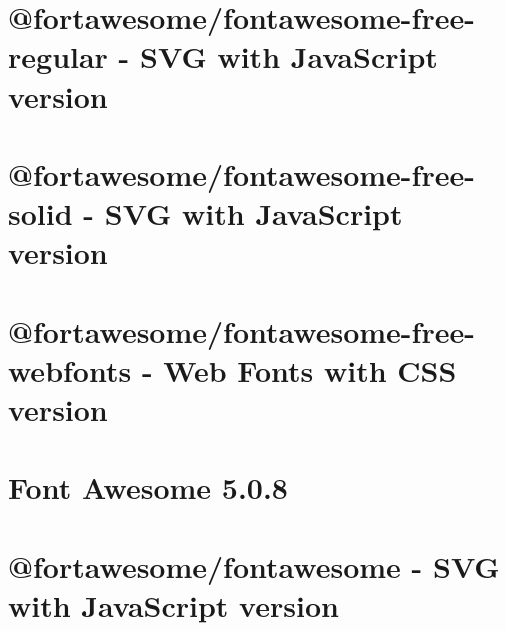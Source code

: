 \let\mypdfximage\pdfximage\def\pdfximage{\immediate\mypdfximage}\documentclass[twoside]{book}
\newcommand{\+}{\discretionary{\mbox{\scriptsize$\hookleftarrow$}}{}{}}
\begin{document}
\chapter{@fortawesome/fontawesome-\/free-\/regular -\/ S\+VG with Java\+Script version}
\label{md_assets_css_fontawesome-free-5_80_88_advanced-options_use-with-node-js_fontawesome-free-regular__r_e_a_d_m_e}

\chapter{@fortawesome/fontawesome-\/free-\/solid -\/ S\+VG with Java\+Script version}
\label{md_assets_css_fontawesome-free-5_80_88_advanced-options_use-with-node-js_fontawesome-free-solid__r_e_a_d_m_e}

\chapter{@fortawesome/fontawesome-\/free-\/webfonts -\/ Web Fonts with C\+SS version}
\label{md_assets_css_fontawesome-free-5_80_88_advanced-options_use-with-node-js_fontawesome-free-webfonts__r_e_a_d_m_e}

\chapter{Font Awesome 5.0.8}
\label{md_assets_css_fontawesome-free-5_80_88__r_e_a_d_m_e}

\chapter{@fortawesome/fontawesome -\/ S\+VG with Java\+Script version}
\label{md_assets_fontawesome-free-5_80_88_advanced-options_use-with-node-js_fontawesome__r_e_a_d_m_e}

\end{document}
